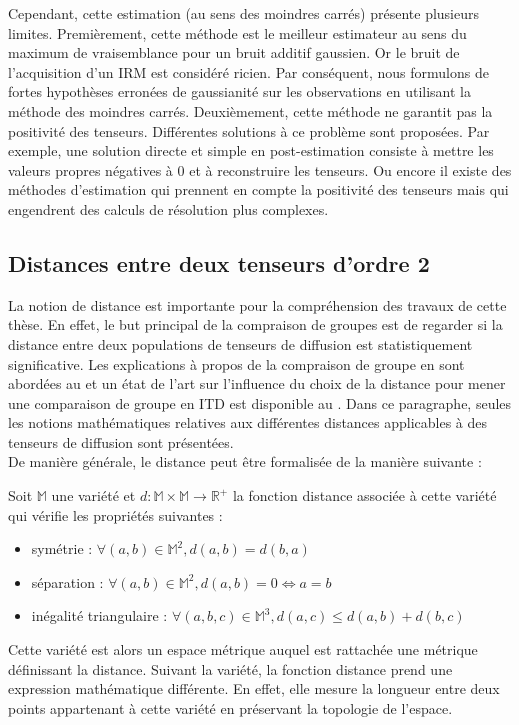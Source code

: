 Cependant, cette estimation (au sens des moindres carrés) présente plusieurs limites.
Premièrement, cette méthode est le meilleur estimateur au sens du maximum de vraisemblance pour un bruit additif gaussien.
Or le bruit de l'acquisition d'un IRM est considéré ricien.
Par conséquent, nous formulons de fortes hypothèses erronées de gaussianité sur les observations en utilisant la méthode des moindres carrés.
Deuxièmement, cette méthode ne garantit pas la positivité des tenseurs.
Différentes solutions à ce problème sont proposées. 
Par exemple, une solution directe et simple en post-estimation consiste à mettre les valeurs propres négatives à 0 
et à reconstruire les tenseurs. 
Ou encore il existe des méthodes d'estimation \cite{Barmpoutis2010} qui prennent en compte la positivité des tenseurs 
mais qui engendrent des calculs de résolution plus complexes.


\subsection{Distances entre deux tenseurs d'ordre 2}
La notion de distance est importante pour la compréhension des travaux de cette thèse.
En effet, le but principal de la compraison de groupes est de regarder 
si la distance entre deux populations de tenseurs de diffusion est statistiquement significative.
Les explications à propos de la compraison de groupe en \itd sont abordées au 
et un état de l'art sur l'influence du choix de la distance pour mener une comparaison de groupe en ITD est disponible au .
Dans ce paragraphe, seules les notions mathématiques relatives aux différentes distances applicables à des tenseurs de diffusion sont présentées.\\

De manière générale, le distance peut être formalisée de la manière suivante :
\begin{adjustwidth}{2cm}{}
    Soit $\mathbb{M}$ une variété et $d:\mathbb{M} \times \mathbb{M} \rightarrow \mathbb{R}^+$ la fonction distance associée à cette variété
    qui vérifie les propriétés suivantes :
    \begin{itemize}
        \item symétrie : $\forall (a,b) \in \mathbb{M}^2, d(a,b)=d(b,a)$
        \item séparation : $\forall (a,b) \in \mathbb{M}^2, d(a,b)=0 \Leftrightarrow a=b$
        \item inégalité triangulaire : $\forall (a,b,c) \in \mathbb{M}^3, d(a,c)\leq d(a,b) + d(b,c)$
    \end{itemize}
    Cette variété est alors un \og espace métrique \fg auquel est rattachée une métrique définissant la distance.
    Suivant la variété, la fonction distance prend une expression mathématique différente.
    En effet, elle mesure la longueur entre deux points appartenant à cette variété en préservant la topologie de l'espace.\\
\end{adjustwidth}

